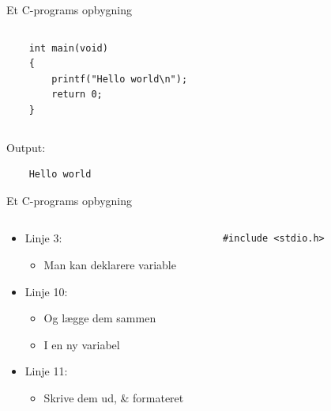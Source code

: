 \documentclass{beamer}
\begin{document}
\begin{frame}[fragile]{Et C-programs opbygning}
\begin{columns}
\begin{column}{0.4\textwidth}
\begin{lstlisting}
	int main(void)
	{
		printf("Hello world\n");
		return 0;
	}
	\end{lstlisting}
	\end{column}
	
	\end{columns}
	
	\begin{center}
	Output:
	\lstset{language=bash, numbers=none}
	\begin{lstlisting}
	Hello world
	\end{lstlisting}
	\end{center}

\end{frame}
\begin{frame}[fragile]{Et C-programs opbygning}
	\begin{columns}
	\begin{small}
	\begin{column}{0.5\textwidth}
	\begin{itemize}
	\item{Linje 3:}
		\begin{itemize}
		\item{Man kan deklarere variable}
		\end{itemize}
	\end{itemize}
	
	\begin{itemize}
	\item{Linje 10:}
		\begin{itemize}
		\item{Og lægge dem sammen}
		\end{itemize}
		\begin{itemize}
		\item{I en ny variabel}
		\end{itemize}
	\end{itemize}
	
	\begin{itemize}
	\item{Linje 11:}
		\begin{itemize}
		\item{Skrive dem ud, & formateret}
		\end{itemize}
	\end{itemize}
	\end{column}
	\end{small}
	
	\begin{column}{0.4\textwidth}
	\begin{lstlisting}
	#include <stdio.h>
	

\end{lstlisting}
\end{column}
\end{columns}
\end{frame}
\end{document}
